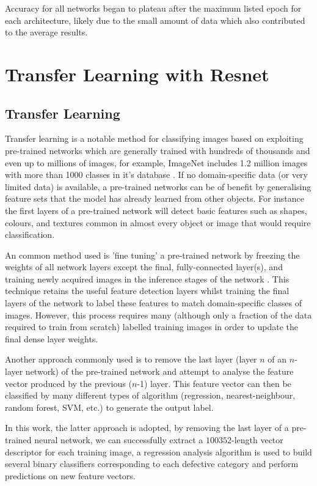 \documentclass[fleqn,twoside,12pt]{report}
\begin{document}
Accuracy for all networks began to plateau after the maximum listed epoch for each architecture, likely due to the small amount of data which also contributed to the average results. 


\section{Transfer Learning with Resnet}


\subsection{Transfer Learning}

Transfer learning is a notable method for classifying images based on exploiting pre-trained networks which are generally trained with hundreds of thousands and even up to millions of images, for example, ImageNet includes 1.2 million images with more than 1000 classes in it's database \cite{shin}. If no domain-specific data (or very limited data) is available, a pre-trained networks can be of benefit by generalising feature sets that the model has already learned from other objects. For instance the first layers of a pre-trained network will detect basic features such as shapes, colours, and textures common in almost every object or image that would require classification. 

An common method used is 'fine tuning' a pre-trained network by freezing the weights of all network layers except the final, fully-connected layer(s), and training newly acquired images in the inference stages of the network \cite{girshick}. This technique retains the useful feature detection layers whilst training the final layers of the network to label these features to match domain-specific classes of images. However, this process requires many (although only a fraction of the data required to train from scratch) labelled training images in order to update the final dense layer weights. 

Another approach commonly used is to remove the last layer (layer $n$ of an $n$-layer network) of the pre-trained network and attempt to analyse the feature vector produced by the previous ($n$-1) layer. This feature vector can then be classified by many different types of algorithm (regression, nearest-neighbour, random forest, SVM, etc.) to generate the output label.

In this work, the latter approach is adopted, by removing the last layer of a pre-trained neural network, we can successfully extract a $100352$-length vector descriptor for each training image, a regression analysis algorithm is used to build several binary classifiers corresponding to each defective category and perform predictions on new feature vectors.
\end{document}
